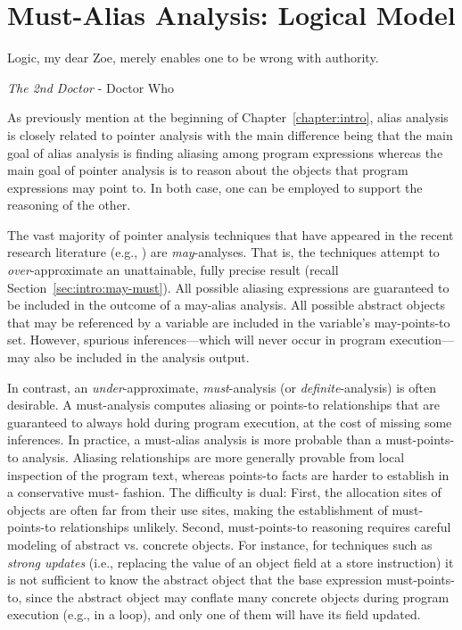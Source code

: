 \chapter{Must-Alias Analysis: Logical Model}
\label{chapter:must-logic}
\epigraph{Logic, my dear Zoe, merely enables one to be wrong with authority.}{\textit{The 2nd Doctor} - Doctor Who}

As previously mention at the beginning of Chapter~\ref{chapter:intro}, alias analysis is closely related to pointer analysis with the main difference being that the main goal of alias analysis is finding aliasing among program expressions whereas the main goal of pointer analysis is to reason about the objects that program expressions may point to. In both case, one can be employed to support the reasoning of the other.

The vast majority of pointer analysis techniques that have appeared in the recent research literature (e.g., \cite{pldi:1999:Yong,pldi:2003:Berndl,cc:2013:Kastrinis,pldi:2007:Hardekopf,article:2005:Milanova,pldi:2004:Whaley,pldi:2006:Sridharan}) are \emph{may}-analyses. That is, the techniques attempt to \emph{over}-approximate an unattainable, fully precise result (recall Section~\ref{sec:intro:may-must}). All possible aliasing expressions are guaranteed to be included in the outcome of a may-alias analysis. All possible abstract objects that may be referenced by a variable are included in the variable's may-points-to set. However, spurious inferences---which will never occur in program execution---may also be included in the analysis output.

In contrast, an \emph{under}-approximate, \emph{must}-analysis (or \emph{definite}-analysis) is often desirable. A must-analysis computes aliasing or points-to relationships that are guaranteed to always hold during program execution, at the cost of missing some inferences. In practice, a must-alias analysis is more probable than a must-points-to analysis. Aliasing relationships are more generally provable from local inspection of the program text, whereas points-to facts are harder to establish in a conservative must- fashion. The difficulty is dual: First, the allocation sites of objects are often far from their use sites, making the establishment of must-points-to relationships unlikely. Second, must-points-to reasoning requires careful modeling of abstract vs. concrete objects. For instance, for techniques such as \emph{strong updates} (i.e., replacing the value of an object field at a store instruction) it is not sufficient to know the abstract object that the base expression must-points-to, since the abstract object may conflate many concrete objects during program execution (e.g., in a loop), and only one of them will have its field updated.

